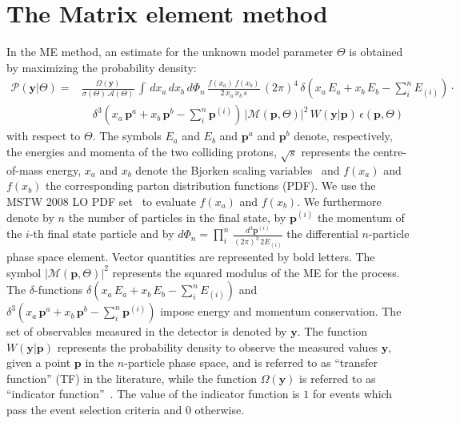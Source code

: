 \section{The Matrix element method}
\label{sec:mem}

In the ME method, an estimate for the unknown model parameter $\Theta$
is obtained by maximizing the probability density:
\begin{align}
\mathcal{P}(\bm{y}|\Theta) = & \frac{\Omega(\bm{y})}{\sigma(\Theta) \,
\mathcal{A}(\Theta)} \, \int \, dx_{a} \, dx_{b} \,
d\Phi_{n} \, \frac{f(x_{a}) \, f(x_{b})}{2 \, x_{a} \, x_{b} \, s} \, (2\pi)^{4} \,
\delta( x_{a} \, E_{a} + x_{b} \, E_{b} - \sum_{i}^{n}
E_{(i)}) \cdot \nonumber \\
 & \quad \delta^{3}( x_{a} \, \bm{p}^{a} + x_{b} \, \bm{p}^{b} - \sum_{i}^{n}
\bm{p}^{(i)}) \, 
  \vert \mathcal{M}(\bm{p},\Theta) \vert^{2} \, W(\bm{y}|\bm{p}) \,
  \epsilon(\bm{p},\Theta) 
\label{eq:mem}
\end{align}
with respect to $\Theta$.
The symbols $E_{a}$ and $E_{b}$ and $\bm{p}^{a}$ and $\bm{p}^{b}$ denote, respectively, the energies and momenta of the two colliding protons,
$\sqrt{s}$ represents the centre-of-mass energy,
$x_{a}$ and $x_{b}$ denote the Bjorken scaling variables~\cite{Bjorkenx}
and $f(x_{a})$ and $f(x_{b})$ the corresponding parton distribution
functions (PDF).
We use the MSTW 2008 LO PDF set~\cite{MSTW} to evaluate $f(x_{a})$ and $f(x_{b})$.
We furthermore denote by $n$ the number of particles in the final state,
by $\bm{p}^{(i)}$ the momentum of the $i$-th final state particle
and by $d\Phi_{n} = \prod_{i}^{n} \,
\frac{d^{3}\bm{p}^{(i)}}{(2\pi)^{3} \, 2 E_{(i)}}$ the differential $n$-particle
phase space element.
Vector quantities are represented by bold letters.
The symbol $\vert \mathcal{M}(\bm{p},\Theta) \vert^{2}$ represents the
squared modulus of the ME for
the process.
The $\delta$-functions $\delta( x_{a} \, E_{a} + x_{b} \, E_{b} - \sum_{i}^{n} E_{(i)})$
and $\delta^{3}( x_{a} \, \bm{p}^{a} + x_{b} \, \bm{p}^{b} - \sum_{i}^{n} \bm{p}^{(i)})$ 
impose energy and momentum conservation.
The set of observables measured in the
detector is denoted by $\bm{y}$.
The function $W(\bm{y}|\bm{p})$ represents the probability density to
observe the measured values $\bm{y}$, given a point $\bm{p}$ in the
$n$-particle phase space, and
is referred to as ``transfer function'' (TF) in the
literature, while the function $\Omega(\bm{y})$ is referred to as ``indicator function''~\cite{Fiedler:2010sg,Volobouev:2011vb}.
The value of the indicator function is $1$ for events which pass the event selection criteria and $0$ otherwise.
